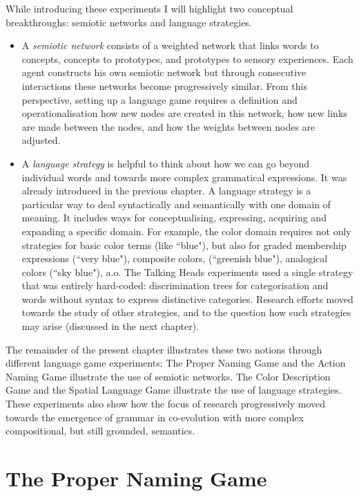 While introducing these experiments I will highlight two conceptual breakthroughs: semiotic networks and language strategies. 
\begin{itemize}
\item A {\itshape semiotic network} consists of a weighted network that links words to concepts, concepts to prototypes, and prototypes to 
sensory experiences. Each agent constructs his own semiotic network but through consecutive 
interactions these networks become progressively similar. From this perspective, setting up a language game requires a definition and 
operationalisation how new nodes are created in this network, how new links are made between 
the nodes, and how the weights between nodes are adjusted. 
\item A {\itshape language strategy} is helpful to think about how we can go beyond individual words and towards 
more complex grammatical expressions. It was already introduced in the previous chapter. 
A language strategy is a particular way to deal syntactically and semantically 
with one domain of meaning. It includes ways for conceptualising, expressing, acquiring and expanding a specific domain. 
For example, the color domain requires not only strategies for basic color terms (like ``blue"), but also for 
graded membership expressions (``very blue"), composite colors, (``greenish blue"), analogical colors (``sky blue"), a.o. 
The Talking Heads experiments used a single strategy that was entirely hard-coded: discrimination trees for categorisation 
and words without syntax to express distinctive categories. Research efforts moved towards the study of other strategies, and 
to the question how such strategies may arise (discussed in the next chapter). 
\end{itemize}
The remainder of the present chapter illustrates these two notions through different language game experiments: The Proper 
Naming Game and the Action Naming Game illustrate the use of semiotic networks. The Color Description Game and the 
Spatial Language Game illustrate the use of language strategies. These experiments also show how the focus of research 
progressively moved towards the emergence of grammar in co-evolution with more complex compositional, but still 
grounded, semantics. 

\section{The Proper Naming Game}

